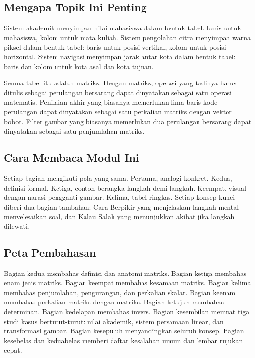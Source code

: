 \documentclass[11pt,a4paper]{article}
\begin{document}
\subsection{Mengapa Topik Ini Penting}

Sistem akademik menyimpan nilai mahasiswa dalam bentuk tabel: baris untuk mahasiswa, kolom untuk mata kuliah. Sistem pengolahan citra menyimpan warna piksel dalam bentuk tabel: baris untuk posisi vertikal, kolom untuk posisi horizontal. Sistem navigasi menyimpan jarak antar kota dalam bentuk tabel: baris dan kolom untuk kota asal dan kota tujuan.

Semua tabel itu adalah matriks. Dengan matriks, operasi yang tadinya harus ditulis sebagai perulangan bersarang dapat dinyatakan sebagai satu operasi matematis. Penilaian akhir yang biasanya memerlukan lima baris kode perulangan dapat dinyatakan sebagai satu perkalian matriks dengan vektor bobot. Filter gambar yang biasanya memerlukan dua perulangan bersarang dapat dinyatakan sebagai satu penjumlahan matriks.

\subsection{Cara Membaca Modul Ini}

Setiap bagian mengikuti pola yang sama. Pertama, analogi konkret. Kedua, definisi formal. Ketiga, contoh berangka langkah demi langkah. Keempat, visual dengan narasi pengganti gambar. Kelima, tabel ringkas. Setiap konsep kunci diberi dua bagian tambahan: Cara Berpikir yang menjelaskan langkah mental menyelesaikan soal, dan Kalau Salah yang menunjukkan akibat jika langkah dilewati.

\subsection{Peta Pembahasan}

Bagian kedua membahas definisi dan anatomi matriks. Bagian ketiga membahas enam jenis matriks. Bagian keempat membahas kesamaan matriks. Bagian kelima membahas penjumlahan, pengurangan, dan perkalian skalar. Bagian keenam membahas perkalian matriks dengan matriks. Bagian ketujuh membahas determinan. Bagian kedelapan membahas invers. Bagian kesembilan memuat tiga studi kasus berturut-turut: nilai akademik, sistem persamaan linear, dan transformasi gambar. Bagian kesepuluh menyandingkan seluruh konsep. Bagian kesebelas dan keduabelas memberi daftar kesalahan umum dan lembar rujukan cepat.
\end{document}
